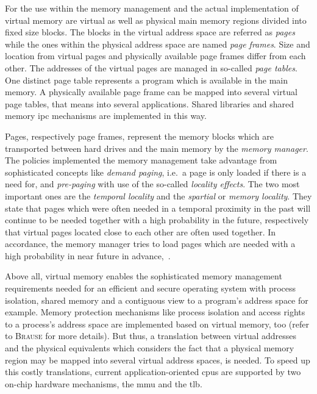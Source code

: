 %
For the use within the memory management and the actual implementation of virtual memory are virtual as well as physical main memory regions divided into fixed size blocks.
The blocks in the virtual address space are referred as \textit{pages} while the ones within the physical address space are named \textit{page frames}.
Size and location from virtual pages and physically available page frames differ from each other. 
The addresses of the virtual pages are managed in so-called \textit{page tables}.
One distinct page table represents a program which is available in the main memory\cite{brause2017betriebssysteme}.
A physically available page frame can be mapped into several virtual page tables, that means into several applications.
Shared libraries and shared memory \ac{ipc} mechanisms are implemented in this way\cite{brause2017betriebssysteme}.

Pages, respectively page frames, represent the memory blocks which are transported between hard drives and the main memory by the \textit{memory manager}.
The policies implemented the memory management take advantage from sophisticated concepts like \textit{demand paging}, i.e.\ a page is only loaded if there is a need for, and \textit{pre-paging} with use of the so-called \textit{locality effects}.
The two most important ones are the \textit{temporal locality} and the \textit{spartial} or \textit{memory locality}.
They state that pages which were often needed in a temporal proximity in the past will continue to be needed together with a high probability in the future, respectively that virtual pages located close to each other are often used together.
In accordance, the memory manager tries to load pages which are needed with a high probability in near future in advance\cite{mandl2014Grundkurs},~\cite{brause2017betriebssysteme}.

Above all, virtual memory enables the sophisticated memory management requirements needed for an efficient and secure operating system with process isolation, shared memory and a contiguous view to a program's address space for example. 
Memory protection mechanisms like process isolation and access rights to a process's address space are implemented based on virtual memory, too (refer to \textsc{Brause}\cite{brause2017betriebssysteme} for more details).
But thus, a translation between virtual addresses and the physical equivalents which considers the fact that a physical memory region may be mapped into several virtual address spaces, is needed. 
To speed up this costly translations, current application-oriented \acp{cpu} are supported by two on-chip hardware mechanisms, the \acf{mmu} and the \acf{tlb}.

